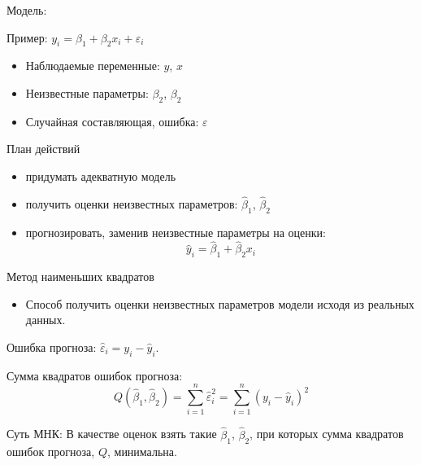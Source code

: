\documentclass[ignorenonframetext,]{beamer}
\begin{document}
\begin{frame}{Модель:}

Пример: $y_i=\beta_1 + \beta_2 x_i + \varepsilon_i$

\begin{itemize}
\itemsep1pt\parskip0pt
\item
  Наблюдаемые переменные: $y$, $x$
\item
  Неизвестные параметры: $\beta_2$, $\beta_2$
\item
  Случайная составляющая, ошибка: $\varepsilon$
\end{itemize}

\begin{block}{План действий}

\begin{itemize}
\itemsep1pt\parskip0pt
\item
  придумать адекватную модель\\
\item
  получить оценки неизвестных параметров: $\hat{\beta}_1$,
  $\hat{\beta}_2$\\
\item
  прогнозировать, заменив неизвестные параметры на оценки:\\\[
  \hat{y}_i=\hat{\beta}_1 + \hat{\beta}_2 x_i
  \]
\end{itemize}

\end{block}

\end{frame}

\begin{frame}{Метод наименьших квадратов}

\begin{itemize}
\itemsep1pt\parskip0pt
\item
  Способ получить оценки неизвестных параметров модели исходя из
  реальных данных.
\end{itemize}

Ошибка прогноза: $\hat{\varepsilon}_i=y_i-\hat{y}_i$.

Сумма квадратов ошибок прогноза: \[
Q(\hat{\beta}_1,\hat{\beta}_2)=\sum_{i=1}^n \hat{\varepsilon}_i^2=\sum_{i=1}^n (y_i-\hat{y}_i)^2
\]

Суть МНК: В качестве оценок взять такие $\hat{\beta}_1$,
$\hat{\beta}_2$, при которых сумма квадратов ошибок прогноза, $Q$,
минимальна.

\end{frame}
\end{document}
